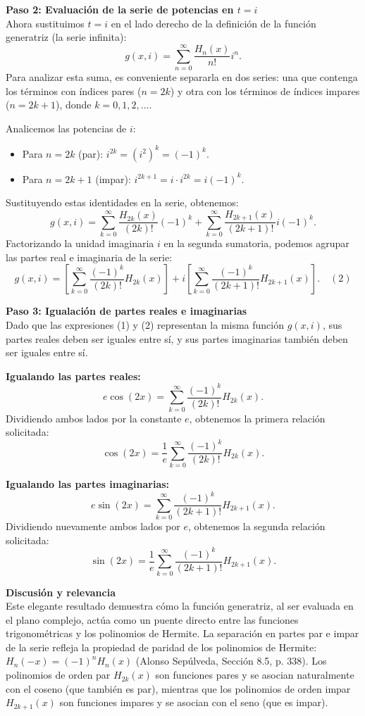 \documentclass[a4paper]{article}
\begin{document}
\vspace{0.3cm}
\noindent\textbf{Paso 2: Evaluación de la serie de potencias en $t = i$} \\
Ahora sustituimos $t = i$ en el lado derecho de la definición de la función generatriz (la serie infinita):
$$
g(x, i) = \sum_{n=0}^{\infty} \frac{H_n(x)}{n!} i^n.
$$
Para analizar esta suma, es conveniente separarla en dos series: una que contenga los términos con índices pares ($n = 2k$) y otra con los términos de índices impares ($n = 2k + 1$), donde $k = 0, 1, 2, \dots$. 

Analicemos las potencias de $i$:
\begin{itemize}
    \item Para $n = 2k$ (par): $i^{2k} = (i^2)^k = (-1)^k$.
    \item Para $n = 2k + 1$ (impar): $i^{2k+1} = i \cdot i^{2k} = i(-1)^k$.
\end{itemize}

Sustituyendo estas identidades en la serie, obtenemos:
$$
g(x, i) = \sum_{k=0}^{\infty} \frac{H_{2k}(x)}{(2k)!} (-1)^k + \sum_{k=0}^{\infty} \frac{H_{2k+1}(x)}{(2k+1)!} i(-1)^k.
$$
Factorizando la unidad imaginaria $i$ en la segunda sumatoria, podemos agrupar las partes real e imaginaria de la serie:
$$
g(x, i) = \left[ \sum_{k=0}^{\infty} \frac{(-1)^k}{(2k)!} H_{2k}(x) \right] + i \left[ \sum_{k=0}^{\infty} \frac{(-1)^k}{(2k+1)!} H_{2k+1}(x) \right]. \quad (2)
$$

\vspace{0.3cm}
\noindent\textbf{Paso 3: Igualación de partes reales e imaginarias} \\
Dado que las expresiones (1) y (2) representan la misma función $g(x, i)$, sus partes reales deben ser iguales entre sí, y sus partes imaginarias también deben ser iguales entre sí. 

\textbf{Igualando las partes reales:}
$$
e \cos(2x) = \sum_{k=0}^{\infty} \frac{(-1)^k}{(2k)!} H_{2k}(x).
$$
Dividiendo ambos lados por la constante $e$, obtenemos la primera relación solicitada:
$$
\cos(2x) = \frac{1}{e} \sum_{k=0}^{\infty} \frac{(-1)^k}{(2k)!} H_{2k}(x).
$$

\textbf{Igualando las partes imaginarias:}
$$
e \sin(2x) = \sum_{k=0}^{\infty} \frac{(-1)^k}{(2k+1)!} H_{2k+1}(x).
$$
Dividiendo nuevamente ambos lados por $e$, obtenemos la segunda relación solicitada:
$$
\sin(2x) = \frac{1}{e} \sum_{k=0}^{\infty} \frac{(-1)^k}{(2k+1)!} H_{2k+1}(x).
$$

\vspace{0.3cm}
\noindent\textbf{Discusión y relevancia} \\
Este elegante resultado demuestra cómo la función generatriz, al ser evaluada en el plano complejo, actúa como un puente directo entre las funciones trigonométricas y los polinomios de Hermite. La separación en partes par e impar de la serie refleja la propiedad de paridad de los polinomios de Hermite: $H_n(-x) = (-1)^n H_n(x)$ (Alonso Sepúlveda, Sección 8.5, p. 338). Los polinomios de orden par $H_{2k}(x)$ son funciones pares y se asocian naturalmente con el coseno (que también es par), mientras que los polinomios de orden impar $H_{2k+1}(x)$ son funciones impares y se asocian con el seno (que es impar). 
\end{document}
